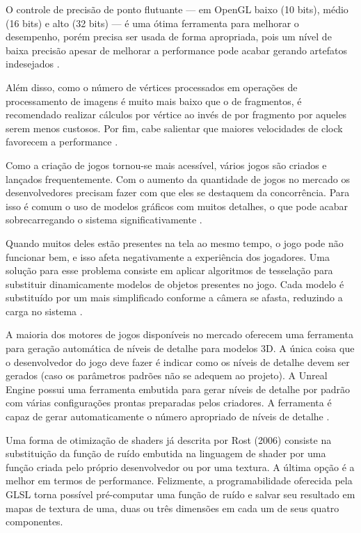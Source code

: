 O controle de precisão de ponto flutuante --- em OpenGL baixo (10 bits), médio (16 bits) e alto (32 bits) --- é uma ótima ferramenta para melhorar o desempenho, porém precisa ser usada de forma apropriada, pois um nível de baixa precisão apesar de melhorar a performance pode acabar gerando artefatos indesejados \cite{optimizationMobile}.

Além disso, como o número de vértices processados em operações de processamento de imagens é muito mais baixo que o de fragmentos, é recomendado realizar cálculos por vértice ao invés de por fragmento por aqueles serem menos custosos. Por fim, cabe salientar que maiores velocidades de clock favorecem a performance \cite{optimizationMobile}.

Como a criação de jogos tornou-se mais acessível, vários jogos são criados e lançados frequentemente. Com o aumento da quantidade de jogos no mercado os desenvolvedores precisam fazer com que eles se destaquem da concorrência. Para isso é comum o uso de modelos gráficos com muitos detalhes, o que pode acabar sobrecarregando o sistema significativamente \cite{performanceTesselation}. 

Quando muitos deles estão presentes na tela ao mesmo tempo, o jogo pode não funcionar bem, e isso afeta negativamente a experiência dos jogadores. Uma solução para esse problema consiste em aplicar algoritmos de tesselação para substituir dinamicamente modelos de objetos presentes no jogo. Cada modelo é substituído por um mais simplificado conforme a câmera se afasta, reduzindo a carga no sistema \cite{performanceTesselation}.

A maioria dos motores de jogos disponíveis no mercado oferecem uma ferramenta para geração automática de níveis de detalhe para modelos 3D. A única coisa que o desenvolvedor do jogo deve fazer é indicar como os níveis de detalhe devem ser gerados (caso os parâmetros padrões não se adequem ao projeto). A Unreal Engine possui uma ferramenta embutida para gerar níveis de detalhe por padrão com várias configurações prontas preparadas pelos criadores. A ferramenta é capaz de gerar automaticamente o número apropriado de níveis de detalhe \cite{performanceTesselation}.

Uma forma de otimização de shaders já descrita por Rost (2006) consiste na substituição da função de ruído embutida na linguagem de shader por uma função criada pelo próprio desenvolvedor ou por uma textura. A última opção é a melhor em termos de performance. Felizmente, a programabilidade oferecida pela GLSL torna possível pré-computar uma função de ruído e salvar seu resultado em mapas de textura de uma, duas ou três dimensões em cada um de seus quatro componentes.

